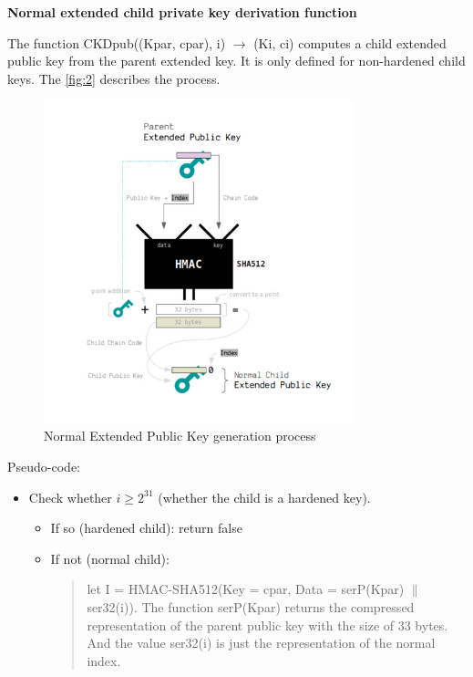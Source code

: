 \begin{adjustwidth}{0.5cm}{}
    \bigskip
    {\textbf{Normal extended child private key derivation function}}
    \label{norm2}

    The function CKDpub((Kpar, cpar), i) $\rightarrow$ (Ki, ci) computes a child extended public key from the parent extended key. It is only defined for non-hardened child keys. 
    The \autoref{fig:2} describes the process.

    \begin{figure}[ht!]
        \centering
        \includegraphics[width=0.8\textwidth]{images/normal_pub_gen.png}
        \caption[Normal Extended Public Key generation process]{Normal Extended Public Key generation process}
        \label{fig:2}
    \end{figure}

    Pseudo-code:
    \begin{itemize}
        \item Check whether $i \geq 2^{31}$ (whether the child is a hardened key).
              \begin{itemize}
                  \item If so (hardened child): return false

                  \item If not (normal child):
                        \begin{quote}

                            let I = HMAC-SHA512(Key = cpar, Data = serP(Kpar) $\parallel$ ser32(i)).
                            The function serP(Kpar) returns the compressed representation of the parent public key with the size of 33 bytes. And the value ser32(i) is just the representation of the normal index.
                        \end{quote}
              \end{itemize}
              \bigskip


\end{itemize}
\end{adjustwidth}
